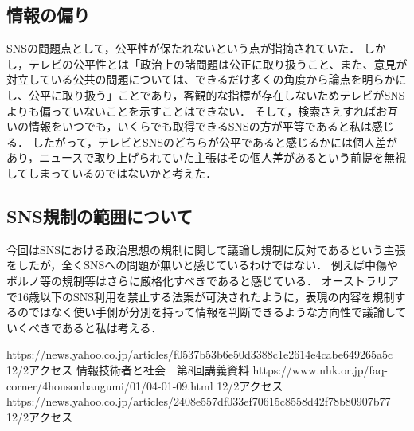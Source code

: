 \documentclass[dvipdfmx]{jarticle}
\begin{document}
\subsection{情報の偏り}
SNSの問題点として，公平性が保たれないという点が指摘されていた．
しかし，テレビの公平性とは「政治上の諸問題は公正に取り扱うこと、また、意見が対立している公共の問題については、できるだけ多くの角度から論点を明らかにし、公平に取り扱う」\cite{3}ことであり，客観的な指標が存在しないためテレビがSNSよりも偏っていないことを示すことはできない．
そして，検索さえすればお互いの情報をいつでも，いくらでも取得できるSNSの方が平等であると私は感じる．
したがって，テレビとSNSのどちらが公平であると感じるかには個人差があり，ニュースで取り上げられていた主張はその個人差があるという前提を無視してしまっているのではないかと考えた．
\subsection{SNS規制の範囲について}
今回はSNSにおける政治思想の規制に関して議論し規制に反対であるという主張をしたが，全くSNSへの問題が無いと感じているわけではない．
例えば中傷やポルノ等の規制等はさらに厳格化すべきであると感じている．
オーストラリアで16歳以下のSNS利用を禁止する法案が可決された\cite{2}ように，表現の内容を規制するのではなく使い手側が分別を持って情報を判断できるような方向性で議論していくべきであると私は考える．
\begin{thebibliography}{99}
     https://news.yahoo.co.jp/articles/f0537b53b6e50d3388c1e2614e4cabe649265a5c 12/2アクセス
     情報技術者と社会　第8回講義資料
     https://www.nhk.or.jp/faq-corner/4housoubangumi/01/04-01-09.html 12/2アクセス
     https://news.yahoo.co.jp/articles/2408e557df033ef70615c8558d42f78b80907b77 12/2アクセス
\end{thebibliography}
\end{document}
